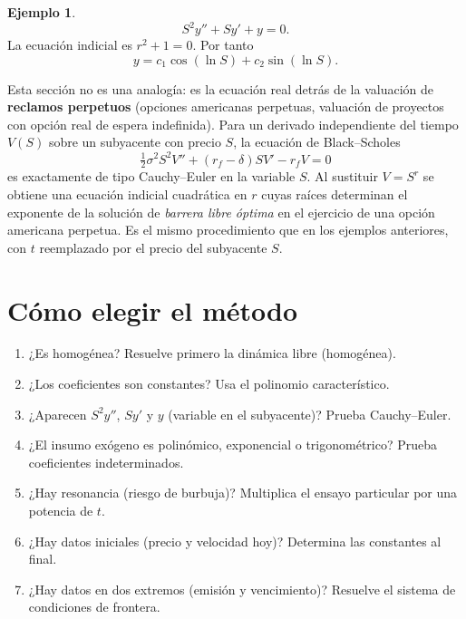 \documentclass[11pt]{article}
\theoremstyle{definition}
\newtheorem{ejemplo}[teorema]{Ejemplo}
\begin{document}
\begin{ejemplo}
\[
S^2y''+Sy'+y=0.
\]
La ecuación indicial es $r^2+1=0$. Por tanto
\[
\boxed{y=c_1\cos(\ln S)+c_2\sin(\ln S)}.
\]
\end{ejemplo}

\begin{finanzas}
Esta sección no es una analogía: es la ecuación real detrás de la valuación de
\textbf{reclamos perpetuos} (opciones americanas perpetuas, valuación de proyectos con
opción real de espera indefinida). Para un derivado independiente del tiempo
$V(S)$ sobre un subyacente con precio $S$, la ecuación de Black--Scholes
\[
\tfrac12\sigma^2S^2V''+(r_f-\delta)SV'-r_fV=0
\]
es exactamente de tipo Cauchy--Euler en la variable $S$. Al sustituir $V=S^r$ se
obtiene una ecuación indicial cuadrática en $r$ cuyas raíces determinan el exponente
de la solución de \emph{barrera libre óptima} en el ejercicio de una opción americana
perpetua. Es el mismo procedimiento que en los ejemplos anteriores, con $t$ reemplazado
por el precio del subyacente $S$.
\end{finanzas}

\section{Cómo elegir el método}
\begin{enumerate}
\item ¿Es homogénea? Resuelve primero la dinámica libre (homogénea).
\item ¿Los coeficientes son constantes? Usa el polinomio característico.
\item ¿Aparecen $S^2y''$, $Sy'$ y $y$ (variable en el subyacente)? Prueba Cauchy--Euler.
\item ¿El insumo exógeno es polinómico, exponencial o trigonométrico? Prueba
coeficientes indeterminados.
\item ¿Hay resonancia (riesgo de burbuja)? Multiplica el ensayo particular por una
potencia de $t$.
\item ¿Hay datos iniciales (precio y velocidad hoy)? Determina las constantes al final.
\item ¿Hay datos en dos extremos (emisión y vencimiento)? Resuelve el sistema de
condiciones de frontera.
\end{enumerate}
\end{document}
